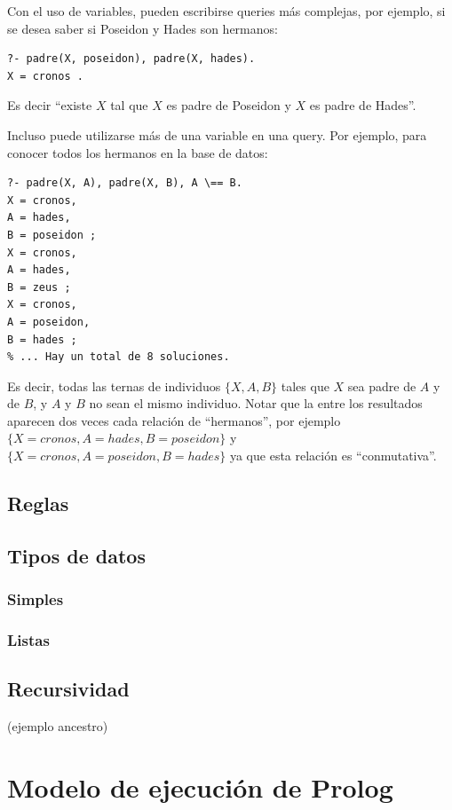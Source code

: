 \documentclass[12pt,titlepage]{article}
\begin{document}
Con el uso de variables, pueden escribirse queries más complejas, por ejemplo, si se desea saber si Poseidon y Hades son hermanos:
\begin{lstlisting}
?- padre(X, poseidon), padre(X, hades).
X = cronos .
\end{lstlisting}

Es decir ``existe $X$ tal que $X$ es padre de Poseidon y $X$ es padre de Hades''.

Incluso puede utilizarse más de una variable en una query. Por ejemplo, para conocer todos los hermanos en la base de datos:
\begin{lstlisting}[label=lst:queryhermanos]
% El \== el operador 'distinto'
?- padre(X, A), padre(X, B), A \== B.
X = cronos,
A = hades,
B = poseidon ;
X = cronos,
A = hades,
B = zeus ;
X = cronos,
A = poseidon,
B = hades ;
% ... Hay un total de 8 soluciones.
\end{lstlisting}

Es decir, todas las ternas de individuos $\{X,A,B\}$ tales que $X$ sea padre de $A$ y de $B$, y $A$ y $B$ no sean el mismo individuo. Notar que la entre los resultados aparecen dos veces cada relación de ``hermanos'', por ejemplo $\{X=cronos,A=hades,B=poseidon\}$ y $\{X=cronos,A=poseidon,B=hades\}$ ya que esta relación es ``conmutativa''.

\subsection{Reglas}
\label{sec:reglas}

\subsection{Tipos de datos}
\label{sec:datos}

\subsubsection{Simples}
\subsubsection{Listas}
\subsection{Recursividad}
(ejemplo ancestro)

\newpage
\section{Modelo de ejecución de Prolog}
\end{document}
